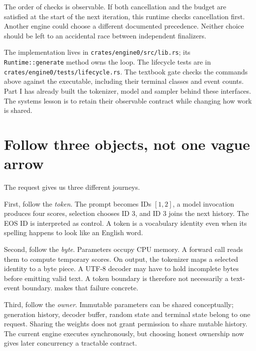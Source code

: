 The order of checks is observable. If both cancellation and the budget are
satisfied at the start of the next iteration, this runtime checks cancellation
first. Another engine could choose a different documented precedence. Neither
choice should be left to an accidental race between independent finalizers.

The implementation lives in \texttt{crates/engine0/src/lib.rs}; its
\texttt{Runtime::generate} method owns the loop. The lifecycle tests are in
\texttt{crates/engine0/tests/lifecycle.rs}. The textbook gate checks the commands
above against the executable, including their terminal classes and event counts.
Part I has already built the tokenizer, model and sampler behind these
interfaces. The systems lesson is to retain their observable contract while
changing how work is shared.

\section{Follow three objects, not one vague arrow}
The request gives us three different journeys.

First, follow the \emph{token}. The prompt becomes IDs $[1,2]$, a model invocation
produces four scores, selection chooses ID 3, and ID 3 joins the next history.
The EOS ID is interpreted as control. A token is a vocabulary identity even
when its spelling happens to look like an English word.

Second, follow the \emph{byte}. Parameters occupy CPU memory. A forward call
reads them to compute temporary scores. On output, the tokenizer maps a
selected identity to a byte piece. A UTF-8 decoder may have to hold incomplete
bytes before emitting valid text. A token boundary is therefore not necessarily
a text-event boundary.  makes that failure concrete.

Third, follow the \emph{owner}. Immutable parameters can be shared conceptually;
generation history, decoder buffer, random state and terminal state belong to
one request. Sharing the weights does not grant permission to share mutable
history. The current engine executes synchronously, but choosing honest
ownership now gives later concurrency a tractable contract.


